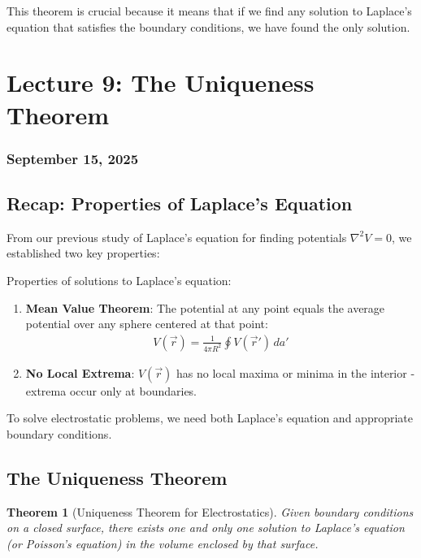 \documentclass{article}
\newtheorem{theorem}{Theorem}[subsection]
\begin{document}
This theorem is crucial because it means that if we find any solution to Laplace's equation that satisfies the boundary conditions, we have found the only solution.


\newpage
\section{Lecture 9: The Uniqueness Theorem}
\subsubsection*{September 15, 2025}

\subsection{Recap: Properties of Laplace's Equation}
From our previous study of Laplace's equation for finding potentials $\nabla^2 V = 0$, we established two key properties:

\begin{conceptbox}
Properties of solutions to Laplace's equation:
\begin{enumerate}
    \item \textbf{Mean Value Theorem}: The potential at any point equals the average potential over any sphere centered at that point:
    \begin{align*}
        V(\vec{r}) = \frac{1}{4\pi R^2}\oint V(\vec{r}') \, da'
    \end{align*}
    
    \item \textbf{No Local Extrema}: $V(\vec{r})$ has no local maxima or minima in the interior - extrema occur only at boundaries.
\end{enumerate}
\end{conceptbox}

To solve electrostatic problems, we need both Laplace's equation and appropriate boundary conditions.

\subsection{The Uniqueness Theorem}

\begin{theorem}[Uniqueness Theorem for Electrostatics]
Given boundary conditions on a closed surface, there exists one and only one solution to Laplace's equation (or Poisson's equation) in the volume enclosed by that surface.
\end{theorem}
\end{document}
